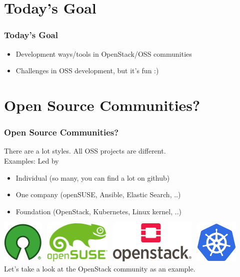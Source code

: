 \documentclass[aspectratio=169,11pt,hyperref={colorlinks=true}]{beamer}
\begin{document}
\section{Today's Goal}
\begin{frame}
  \frametitle{Today's Goal}
  \begin{itemize}
    \item Development ways/tools in OpenStack/OSS communities
    \item Challenges in OSS development, but it's fun :)
  \end{itemize}
\end{frame}

\section{Open Source Communities?}
\begin{frame}
  \frametitle{Open Source Communities?}
  There are a lot styles. All OSS projects are different.\\
  Examples: Led by
  \begin{itemize}
    \item Individual (so many, you can find a lot on github)
    \item One company (openSUSE, Ansible, Elastic Search, ..)
    \item Foundation (OpenStack, Kubernetes, Linux kernel, ..)
  \end{itemize}
  \includegraphics[height=20mm]{images/osi-keyhole.png}~
  \includegraphics[height=20mm]{images/openSUSE-logo.png}~
  \includegraphics[height=20mm]{images/openstack-logo.png}~
  \includegraphics[height=20mm]{images/kubernetes-logo.png}
  \\
  Let's take a look at the OpenStack community as an example.
\end{frame}
\end{document}
